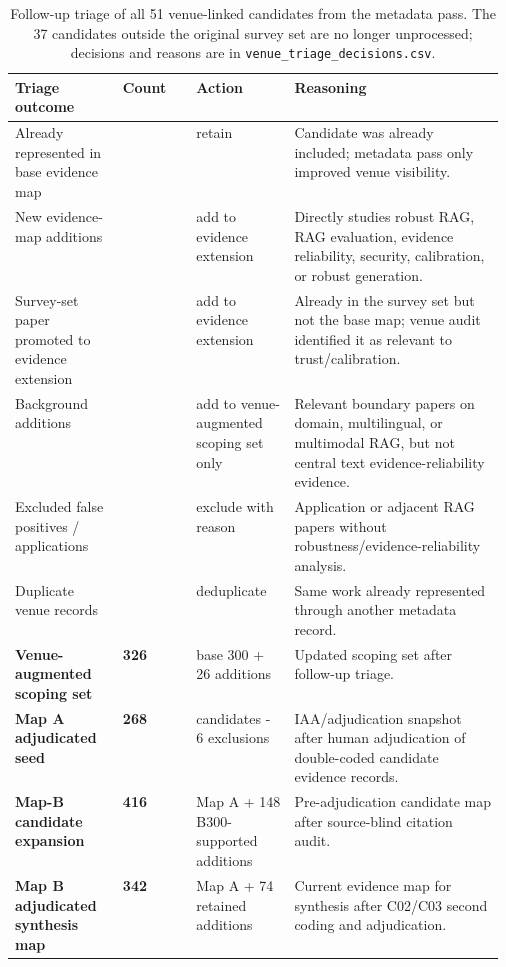\documentclass[11pt]{article}
\begin{document}
\begin{table}[t]
\centering
\scriptsize
\renewcommand{\arraystretch}{0.94}
\begin{tabularx}{\linewidth}{>{\raggedright\arraybackslash}p{0.22\linewidth}>{\raggedright\arraybackslash}p{0.15\linewidth}>{\raggedright\arraybackslash}p{0.20\linewidth}X}
\toprule
\textbf{Triage outcome} & \textbf{Count} & \textbf{Action} & \textbf{Reasoning} \\
\midrule
Already represented in base evidence map & 13 & retain & Candidate was already included; metadata pass only improved venue visibility. \\
New evidence-map additions & 23 & add to evidence extension & Directly studies robust RAG, RAG evaluation, evidence reliability, security, calibration, or robust generation. \\
Survey-set paper promoted to evidence extension & 1 & add to evidence extension & Already in the survey set but not the base map; venue audit identified it as relevant to trust/calibration. \\
Background additions & 3 & add to venue-augmented scoping set only & Relevant boundary papers on domain, multilingual, or multimodal RAG, but not central text evidence-reliability evidence. \\
Excluded false positives / applications & 9 & exclude with reason & Application or adjacent RAG papers without robustness/evidence-reliability analysis. \\
Duplicate venue records & 2 & deduplicate & Same work already represented through another metadata record. \\
\midrule
\textbf{Venue-augmented scoping set} & \textbf{326} & base 300 + 26 additions & Updated scoping set after follow-up triage. \\
\textbf{Map A adjudicated seed} & \textbf{268} & 274 candidates - 6 exclusions & IAA/adjudication snapshot after human adjudication of double-coded candidate evidence records. \\
\textbf{Map-B candidate expansion} & \textbf{416} & Map A + 148 B300-supported additions & Pre-adjudication candidate map after source-blind citation audit. \\
\textbf{Map B adjudicated synthesis map} & \textbf{342} & Map A + 74 retained additions & Current evidence map for synthesis after C02/C03 second coding and adjudication. \\
\bottomrule
\end{tabularx}
\caption{Follow-up triage of all 51 venue-linked candidates from the metadata pass. The 37 candidates outside the original survey set are no longer unprocessed; decisions and reasons are in \texttt{venue\_triage\_decisions.csv}.}
\label{tab:venue-triage-summary}
\end{table}
\end{document}
